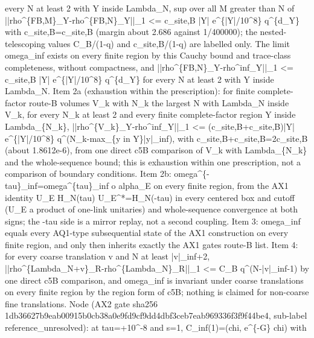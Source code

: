 \begin{gatequote}
every N at least 2 with Y inside Lambda\_N, sup over all M greater than N of
||rho\textasciicircum{}\{FB,M\}\_Y-rho\textasciicircum{}\{FB,N\}\_Y||\_1 <=
c\textquotesingle{}\_site,B |Y|
e\textasciicircum{}\{|Y|/10\textasciicircum{}8\} q\textasciicircum{}\{d\_Y\}
with c\textquotesingle{}\_site,B=c\_site,B (margin about 2.686 against
1/400000); the nested-telescoping values C\_B/(1-q) and c\_site,B/(1-q) are
labelled only. The limit omega\_inf exists on every finite region by this
Cauchy bound and trace-class completeness, without compactness, and
||rho\textasciicircum{}\{FB,N\}\_Y-rho\textasciicircum{}inf\_Y||\_1 <=
c\textquotesingle{}\_site,B |Y|
e\textasciicircum{}\{|Y|/10\textasciicircum{}8\} q\textasciicircum{}\{d\_Y\}
for every N at least 2 with Y inside Lambda\_N. Item 2a (exhaustion within the
prescription): for finite complete-factor route-B volumes V\_k with N\_k the
largest N with Lambda\_N inside V\_k, for every N\_k at least 2 and every
finite complete-factor region Y inside Lambda\_\{N\_k\},
||rho\textasciicircum{}\{V\_k\}\_Y-rho\textasciicircum{}inf\_Y||\_1 <=
(c\_site,B+c\textquotesingle{}\_site,B)|Y|
e\textasciicircum{}\{|Y|/10\textasciicircum{}8\}
q\textasciicircum{}(N\_k-max\_\{y in Y\}|y|\_inf), with
c\_site,B+c\textquotesingle{}\_site,B=2c\_site,B (about 1.8612e-6), from one
direct c5B comparison of V\_k with Lambda\_\{N\_k\} and the whole-sequence
bound; this is exhaustion within one prescription, not a comparison of
boundary conditions. Item 2b:
omega\textasciicircum{}\{-tau\}\_inf=omega\textasciicircum{}\{tau\}\_inf o
alpha\_E on every finite region, from the AX1 identity U\_E H\_N(tau)
U\_E\textasciicircum{}*=H\_N(-tau) in every centered box and cutoff (U\_E a
product of one-link unitaries) and whole-sequence convergence at both signs;
the -tau side is a mirror replay, not a second coupling. Item 3: omega\_inf
equals every AQ1-type subsequential state of the AX1 construction on every
finite region, and only then inherits exactly the AX1 gate\textquotesingle{}s
route-B list. Item 4: for every coarse translation v and N at least
|v|\_inf+2,
||rho\textasciicircum{}\{Lambda\_N+v\}\_R-rho\textasciicircum{}\{Lambda\_N\}\_R||\_1
<= C\_B q\textasciicircum{}(N-|v|\_inf-1) by one direct c5B comparison, and
omega\_inf is invariant under coarse translations on every finite region by
the region form of c5B; nothing is claimed for non-coarse fine translations.
Node (AX2 gate sha256
1db36627b9eab00915b0cb38a0e9fd9cf9dd4dbf3ceb7eab969336f3f9f44be4, sub-label
reference\_unresolved): at tau=+10\textasciicircum{}-8 and s=1,
C\_inf(1)=(chi, e\textasciicircum{}\{-G\} chi) with

\end{gatequote}
